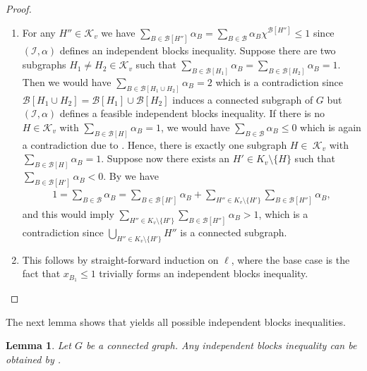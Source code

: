 \documentclass[12pt]{amsart}
\newtheorem{lemma}[theorem]{Lemma}
\newcommand{\K}{\mathcal{K}}
\newcommand{\I}{\mathcal{I}}
\newcommand{\B}{\mathcal{B}}
\begin{document}
\begin{proof}
    \begin{enumerate}[$(i)$]
        \item For any $H'' \in \K_v$ we have $\sum_{B \in \B[H'']}\alpha_B=\sum_{B \in \B}\alpha_B\chi^{\B[H'']} \le 1$ since $(\I,\alpha)$ defines an independent blocks inequality. Suppose there are two subgraphs $H_1 \neq H_2 \in \K_v$ such that $\sum_{B \in \B[H_1]}\alpha_B=\sum_{B \in \B[H_2]}\alpha_B=1$. Then we would have $\sum_{B \in \B[H_1 \cup H_2]}\alpha_B=2$ which is a contradiction since $\B[H_1 \cup H_2]=\B[H_1]\cup\B[H_2]$ induces a connected subgraph of $G$ but $(\I,\alpha)$ defines a feasible independent blocks inequality. If there is no $H \in \K_v$ with $\sum_{B \in \B[H]}\alpha_B=1$, we would have $\sum_{B \in \B}\alpha_B \le 0$ which is again a contradiction due to . Hence, there is exactly one subgraph $H \in~\K_v$ with $\sum_{B \in \B[H]}\alpha_B=1$. Suppose now there exists an $H' \in K_v\setminus\{H\}$ such that $\sum_{B \in \B[H']}\alpha_B<0$. By  we have
        \begin{align*}
            1=\sum_{B \in \B}\alpha_B=\sum_{B \in \B[H']}\alpha_B+\sum_{H'' \in K_v\setminus \{H'\}}\sum_{B\in\B[H'']}\alpha_B,
        \end{align*}
        and this would imply $\sum_{H'' \in K_v\setminus \{H'\}}\sum_{B\in\B[H'']}\alpha_B > 1$, which is a contradiction since $\bigcup_{H'' \in K_v\setminus \{H'\}}H''$ is a connected subgraph.
        \item This follows by straight-forward induction on $\ell$, where the base case is the fact that $x_{B_1} \le 1$ trivially forms an independent blocks inequality. \qedhere 
    \end{enumerate}
    
\end{proof}

The next lemma shows that  yields all possible independent blocks inequalities.

\begin{lemma}
\label{lemma}
Let $G$ be a connected graph. Any independent blocks inequality can be obtained by .
\end{lemma}
\end{document}
